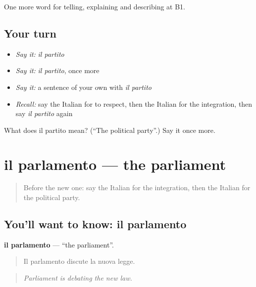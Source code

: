 \begin{grammarlens}[title={What you've built}]
One more word for telling, explaining and describing at B1.
\end{grammarlens}

\subsection*{Your turn}
\begin{itemize}
\raggedright
  \item \emph{Say it:} \emph{il partito}
  \item \emph{Say it:} \emph{il partito}, once more
  \item \emph{Say it:} a sentence of your own with \emph{il partito}
  \item \emph{Recall:} say the Italian for to respect, then the Italian for the integration, then say \emph{il partito} again
\end{itemize}

\begin{tcolorbox}[breakable,colback=teal!4,colframe=teal!35!black,title={Before you move on}]
What does il partito mean? (\textquotedblleft{}The political party\textquotedblright{}.) Say it once more.
\end{tcolorbox}
\section[il parlamento]{il parlamento — the parliament}

\label{lesson:IT-C369-parlamento}



\begin{quote}
Before the new one: say the Italian for the integration, then the Italian for the political party.
\end{quote}

\subsection*{You'll want to know: il parlamento}
\textbf{il parlamento} — \textquotedblleft{}the parliament\textquotedblright{}.

\begin{quote}
Il parlamento discute la nuova legge.
\end{quote}

\begin{quote}
\emph{Parliament is debating the new law.}
\end{quote}

